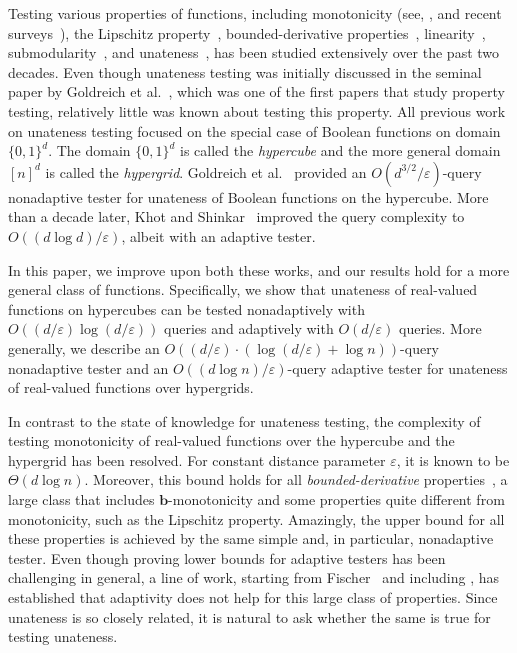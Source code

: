 \documentclass{toc}
\newcommand{\eps}{\varepsilon}
\newcommand{\bb}{\ensuremath{\mathbf{b}}}
\begin{document}
Testing various properties of functions, including
monotonicity
(see, \eg, \cite{GGLRS00, Ras99, DGLRRS99, EKKRV00, LR01, FLNRRS02, Ras03, Fis04, HK07, AC06, HK08, BRW05, BBM12, BGJRW12, BCGM12, CS13, BlaRY14, BerRY14, CS14, CS16, CDJS17, CST14, CDST15, KMS18, BB15, BB16, DRTV16, PRV17, CWX17, B18, BCS18, CS19, BCS20, PRW20} and recent surveys~\cite{Ras10, Ras16, C16a}),
the Lipschitz property~\cite{JR13, CS13, DJRT13, BlaRY14, AJMR16}, bounded-derivative properties~\cite{CDJS17}, linearity~\cite{BLR93, BCHKS96, BCLR08, KLX10, RR16}, submodularity~\cite{PRR03, RY13, SV14, BB17}, and unateness~\cite{GGLRS00,KS16}, has been studied extensively over the past two decades. Even though unateness testing was initially discussed in the seminal paper
by Goldreich et al.~\cite{GGLRS00},
which was one of the first papers that study property testing, 
%
relatively little was known about testing this property. All previous work on unateness testing focused on the special case of Boolean functions on domain $\{0,1\}^d$. The domain $\{0,1\}^d$ is called the \emph{hypercube} and the more general domain $[n]^d$ is called the \emph{hypergrid}.
Goldreich et al.~\cite{GGLRS00}
provided 
%
%
%
an
%
$O({d^{3/2}}/{\eps})$-query nonadaptive tester for unateness of Boolean functions on the hypercube.
More than a decade later, Khot and Shinkar~\cite{KS16} improved the query complexity
to $O((d\log d)/\eps)$, albeit with an adaptive tester.

In this paper, we improve upon both these works, and our results hold for a more general class of functions.
Specifically, we show that unateness of real-valued functions on hypercubes can be tested nonadaptively with $O(( d /\eps) \log (d/ \eps))$ queries and adaptively with $O(d/\eps)$ queries. More generally, we describe 
%
%
an
%
$O((d/\eps) \cdot(\log (d/\eps) + \log n))$-query nonadaptive tester and 
%
%
an
%
$O(({d\log n})/\eps)$-query adaptive tester for unateness of real-valued functions over hypergrids.

In contrast to the state of knowledge for unateness testing, the complexity of testing monotonicity of real-valued functions over the hypercube and the hypergrid has been resolved. For constant distance parameter $\eps$, it is known to be $\Theta(d\log n)$. Moreover, this bound holds for all \emph{bounded-derivative} properties~\cite{CDJS17}, a large class that includes $\bb$-monotonicity and some properties quite different from monotonicity, such as the Lipschitz property. Amazingly, the upper bound for all these properties is achieved by the same simple and, in particular, nonadaptive tester.
Even though proving lower bounds for adaptive testers has been challenging in general, a line of work, starting from Fischer~\cite{Fis04} and including \cite{BBM12,CS14,CDJS17}, has established that adaptivity does not help for this large class of properties. Since unateness is so closely related, it is natural to ask whether the same is true for testing unateness.
\end{document}

